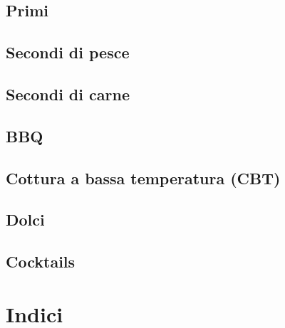 \documentclass{report}
\begin{document}
\newpage
\chapter{Primi}









\newpage
\chapter{Secondi di pesce}




\newpage
\chapter{Secondi di carne}



\newpage
\chapter{BBQ}







\newpage
\chapter{Cottura a bassa temperatura (CBT)}



%
\newpage
\chapter{Dolci}











\chapter{Cocktails}








\newpage
\part{Indici}
\printindex
\end{document}
